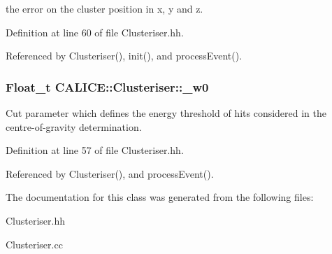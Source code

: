 the error on the cluster position in x, y and z. 

Definition at line 60 of file Clusteriser.hh.

Referenced by Clusteriser(), init(), and processEvent().
\subsubsection[{\_\-w0}]{\setlength{\rightskip}{0pt plus 5cm}Float\_\-t {\bf CALICE::Clusteriser::\_\-w0}\hspace{0.3cm}{\ttfamily  [protected]}}\label{classCALICE_1_1Clusteriser_aa761e8e58c6b8b4239ebccf1cf7e0f44}


Cut parameter which defines the energy threshold of hits considered in the centre-\/of-\/gravity determination. 

Definition at line 57 of file Clusteriser.hh.

Referenced by Clusteriser(), and processEvent().

The documentation for this class was generated from the following files:\begin{DoxyCompactItemize}
\item 
Clusteriser.hh\item 
Clusteriser.cc\end{DoxyCompactItemize}
